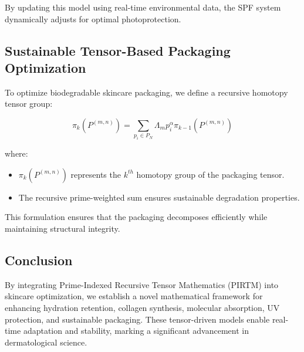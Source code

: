 \documentclass{article}
\theoremstyle{plain}
\theoremstyle{claimstyle}
\begin{document}
By updating this model using real-time environmental data, the SPF system dynamically adjusts for optimal photoprotection.

\subsection{Sustainable Tensor-Based Packaging Optimization}
To optimize biodegradable skincare packaging, we define a recursive homotopy tensor group:

\begin{equation}
\pi_k (P^{(m,n)}) = \sum_{p_i \in P_N} \Lambda_m p_i^{\alpha} \pi_{k-1} (P^{(m,n)})
\end{equation}

where:
\begin{itemize}
    \item $\pi_k (P^{(m,n)})$ represents the $k^{th}$ homotopy group of the packaging tensor.
    \item The recursive prime-weighted sum ensures sustainable degradation properties.
\end{itemize}

This formulation ensures that the packaging decomposes efficiently while maintaining structural integrity.

\subsection{Conclusion}
By integrating Prime-Indexed Recursive Tensor Mathematics (PIRTM) into skincare optimization, we establish a novel mathematical framework for enhancing hydration retention, collagen synthesis, molecular absorption, UV protection, and sustainable packaging. These tensor-driven models enable real-time adaptation and stability, marking a significant advancement in dermatological science.

\nocite{*}


\end{document}
